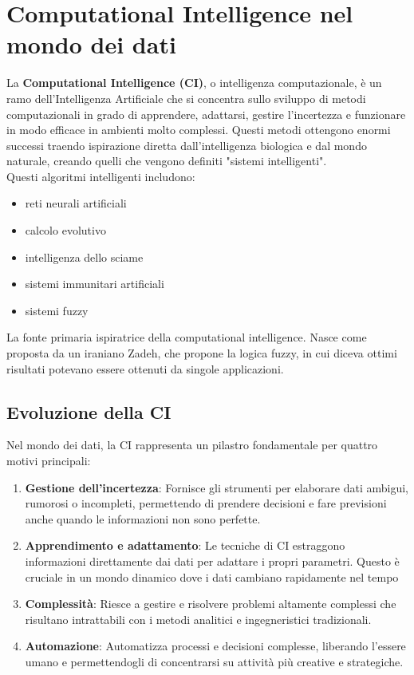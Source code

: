 \section{Computational Intelligence nel mondo dei dati}
La \textbf{Computational Intelligence (CI)}, o intelligenza computazionale, è un 
ramo dell'Intelligenza Artificiale che si concentra sullo sviluppo di metodi 
computazionali in grado di apprendere, adattarsi, gestire l'incertezza e funzionare 
in modo efficace in ambienti molto complessi.
Questi metodi ottengono enormi successi traendo ispirazione diretta dall'intelligenza 
biologica e dal mondo naturale, creando quelli che vengono definiti 
"sistemi intelligenti".\\

Questi algoritmi intelligenti includono:
\begin{itemize}
    \item reti neurali artificiali
    \item calcolo evolutivo
    \item intelligenza dello sciame
    \item sistemi immunitari artificiali
    \item sistemi fuzzy
\end{itemize}

La fonte primaria ispiratrice della computational intelligence. Nasce come proposta
da un iraniano Zadeh, che propone la logica fuzzy, in cui diceva ottimi risultati potevano
essere ottenuti da singole applicazioni.

\subsection{Evoluzione della CI}
Nel mondo dei dati, la CI rappresenta un pilastro fondamentale per quattro motivi principali:
\begin{enumerate}
    \item \textbf{Gestione dell'incertezza}: Fornisce gli strumenti per elaborare 
    dati ambigui, rumorosi o incompleti, permettendo di prendere decisioni e fare 
    previsioni anche quando le informazioni non sono perfette.
    \item \textbf{Apprendimento e adattamento}: Le tecniche di CI estraggono 
    informazioni direttamente dai dati per adattare i propri parametri. 
    Questo è cruciale in un mondo dinamico dove i dati cambiano rapidamente nel tempo
    \item \textbf{Complessità}: Riesce a gestire e risolvere problemi altamente 
    complessi che risultano intrattabili con i metodi analitici e ingegneristici 
    tradizionali.
    \item \textbf{Automazione}: Automatizza processi e decisioni complesse, 
    liberando l'essere umano e permettendogli di concentrarsi su attività 
    più creative e strategiche.
\end{enumerate}

